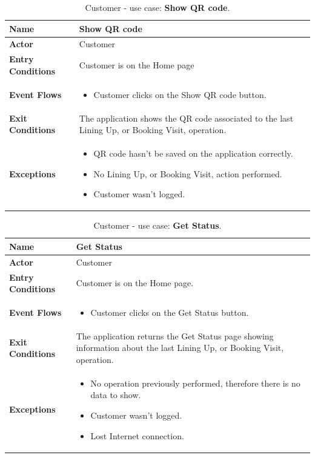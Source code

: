 \begin{table}[hbt!]
\centering
\begin{tabular}{| m{} | m{} |} 
	\hline
	\textbf{Name} & Show QR code \\ 
	\hline
	\textbf{Actor} & Customer \\ 
	\hline
	\textbf{Entry Conditions} & Customer is on the Home page \\ 
	\hline
	\textbf{Event Flows} &
	\begin{itemize}
	\item Customer clicks on the Show QR code button.
	\end{itemize} \\ 
	\hline
	\textbf{Exit Conditions} & The application shows the QR code associated to the last Lining Up, or Booking Visit, operation. \\ 
	\hline
	\textbf{Exceptions} &
	\begin{itemize}
	\item QR code hasn't be saved on the application correctly.
	\item No Lining Up, or Booking Visit, action performed. %
	\item Customer wasn't logged.
	\end{itemize} \\ 
	\hline
\end{tabular}
\caption{Customer - use case: \textbf{Show QR code}.}
\label{tableLogIn}
\end{table}

\begin{table}[hbt!]
\centering
\begin{tabular}{| m{} | m{} |} 
	\hline
	\textbf{Name} & Get Status \\ 
	\hline
	\textbf{Actor} & Customer \\ 
	\hline
	\textbf{Entry Conditions} & Customer is on the Home page. \\ 
	\hline
	\textbf{Event Flows} &
	\begin{itemize}
	\item Customer clicks on the Get Status button.
	\end{itemize} \\ 
	\hline
	\textbf{Exit Conditions} & The application returns the Get Status page showing information about the last Lining Up, or Booking Visit, operation. \\ 
	\hline
	\textbf{Exceptions} &
	\begin{itemize}
	\item No operation previously performed, therefore there is no data to show.
	\item Customer wasn't logged.
	\item Lost Internet connection.
	\end{itemize} \\ 
	\hline
\end{tabular}
\caption{Customer - use case: \textbf{Get Status}.}
\label{tableLogIn}
\end{table}

